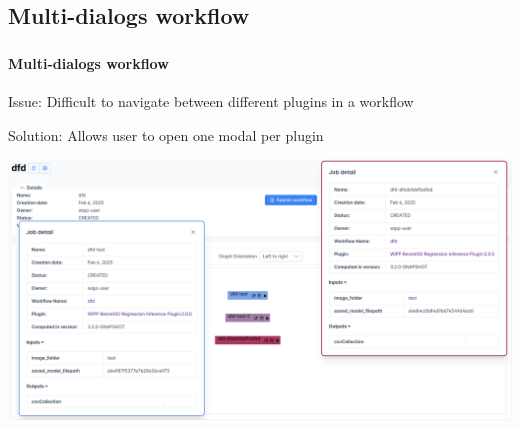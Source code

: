 \def\slidetitle{Multi-dialogs workflow}

\subsection{\slidetitle}
\begin{frame}
  \frametitle{\sectiontitle}
  \framesubtitle{\slidetitle}

  Issue: Difficult to navigate between different plugins in a workflow

  Solution: Allows user to open one modal per plugin

  \begin{minipage}[h!]{0.50\textwidth}
    \includegraphics[scale=0.18]{./img/multi_modals.png}
  \end{minipage}\hfill
\end{frame}
